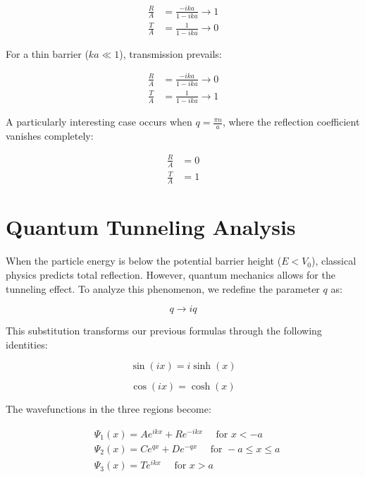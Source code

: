 \begin{align}
\frac{R}{A} & =\frac{-i k a}{1-i k a} \rightarrow 1 \\
\frac{T}{A} & =\frac{1}{1-i k a} \rightarrow 0
\end{align}

For a thin barrier ($ka \ll 1$), transmission prevails:

\begin{align}
\frac{R}{A} & =\frac{-i k a}{1-i k a} \rightarrow 0 \\
\frac{T}{A} & =\frac{1}{1-i k a} \rightarrow 1
\end{align}

A particularly interesting case occurs when $q=\frac{\pi n}{a}$, where the reflection coefficient vanishes completely:

\begin{align}
\frac{R}{A} & =0 \\
\frac{T}{A} & =1
\end{align}


\section{Quantum Tunneling Analysis}

When the particle energy is below the potential barrier height ($E < V_0$), classical physics predicts total reflection. However, quantum mechanics allows for the tunneling effect. To analyze this phenomenon, we redefine the parameter $q$ as:

\begin{equation}
q \rightarrow i q
\end{equation}

This substitution transforms our previous formulas through the following identities:

\begin{equation}
\sin (i x)=i \sinh (x)
\end{equation}

\begin{equation}
\cos (i x)=\cosh (x)
\end{equation}

The wavefunctions in the three regions become:

\begin{align}
& \Psi_{1}(x)=A e^{i k x}+R e^{-i k x} \quad \text { for } x<-a \\
& \Psi_{2}(x)=C e^{q x}+D e^{-q x} \quad \text { for }-a \leq x \leq a  \\
& \Psi_{3}(x)=T e^{i k x} \quad \text { for } x>a
\end{align}

